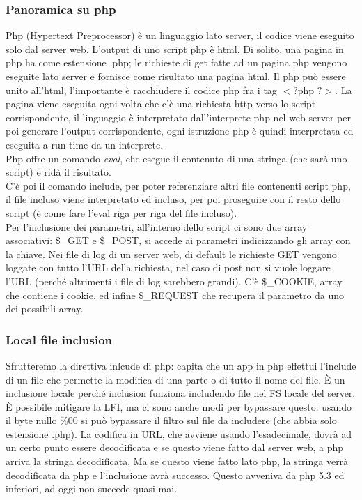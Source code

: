 \documentclass{article}
\begin{document}
\subsubsection{Panoramica su php}
Php (Hypertext Preprocessor) è un linguaggio lato server, il codice viene eseguito solo dal server web. L'output di uno script php è html. Di solito, una pagina in php ha come estensione .php; le richieste di get fatte ad un pagina php vengono eseguite lato server e fornisce come risultato una pagina html. Il php può essere unito all'html, l'importante è racchiudere il codice php fra i tag $<?$php $?>$. La pagina viene eseguita ogni volta che c'è una richiesta http verso lo script corrispondente, il linguaggio è interpretato dall'interprete php nel web server per poi generare l'output corrispondente, ogni istruzione php è quindi interpretata ed eseguita a run time da un interprete.\\ Php offre un comando \textit{eval}, che esegue il contenuto di una stringa (che sarà uno script) e ridà il risultato.\\ C'è poi il comando include, per poter referenziare altri file contenenti script php, il file incluso viene interpretato ed incluso, per poi proseguire con il resto dello script (è come fare l'eval riga per riga del file incluso).\\ Per l'inclusione dei parametri, all'interno dello script ci sono due array associativi: \$\_GET e \$\_POST, si accede ai parametri indicizzando gli array con la chiave. Nei file di log di un server web, di default le richieste GET vengono loggate con tutto l'URL della richiesta, nel caso di post non si vuole loggare l'URL (perché altrimenti i file di log sarebbero grandi). C'è \$\_COOKIE, array che contiene i cookie, ed infine \$\_REQUEST che recupera il parametro da uno dei possibili array.
\subsubsection{Local file inclusion}
Sfrutteremo la direttiva inlcude di php: capita che un app in php effettui l'include di un file che permette la modifica di una parte o di tutto il nome del file. È un inclusione locale perché inclusion funziona includendo file nel FS locale del server. È possibile mitigare la LFI, ma ci sono anche modi per bypassare questo: usando il byte nullo \%00 si può bypassare il filtro sul file da includere (che abbia solo estensione .php). La codifica in URL, che avviene usando l'esadecimale, dovrà ad un certo punto essere decodificata e se questo viene fatto dal server web, a php arriva la stringa decodificata. Ma se questo viene fatto lato php, la stringa verrà decodificata da php e l'inclusione avrà successo. Questo avveniva da php 5.3 ed inferiori, ad oggi non succede quasi mai.
\end{document}
